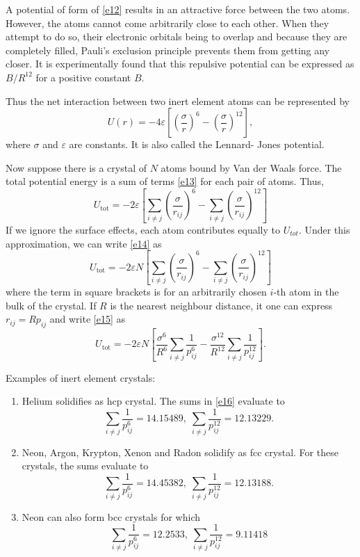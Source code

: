 \documentclass{article}
\begin{document}
A potential of form of \eqref{e12} results in an attractive force between the
two atoms. However, the atoms cannot come arbitrarily close to each other. When
they attempt to do so, their electronic orbitals being to overlap and because
they are completely filled, Pauli's exclusion principle prevents them from
getting any closer. It is experimentally found that this repulsive potential can
be expressed as $B/R^{12}$ for a positive constant $B$.

Thus the net interaction between two inert element atoms can be represented by
\begin{equation}\label{e13}
U(r) = -4\varepsilon\left[\left(\frac{\sigma}{r}\right)^6 - 
\left(\frac{\sigma}{r}\right)^{12}\right],
\end{equation}
where $\sigma$ and $\varepsilon$ are constants. It is also called the Lennard-
Jones potential.

Now suppose there is a crystal of $N$ atoms bound by Van der Waals force. The
total potential energy is a sum of terms \eqref{e13} for each pair of atoms.
Thus,
\begin{equation}\label{e14}
U_{\text{tot}} = -2\varepsilon\left[
\sum_{i \ne j}\left(\frac{\sigma}{r_{ij}}\right)^6 - 
\sum_{i \ne j}\left(\frac{\sigma}{r_{ij}}\right)^{12}\right]
\end{equation}
If we ignore the surface effects, each atom contributes equally to $U_{tot}$.
Under this approximation, we can write \eqref{e14} as
\begin{equation}\label{e15}
U_{\text{tot}} = -2\varepsilon N\left[
\sum_{i \ne j}\left(\frac{\sigma}{r_{ij}}\right)^6 - 
\sum_{i \ne j}\left(\frac{\sigma}{r_{ij}}\right)^{12}\right]
\end{equation}
where the term in square brackets is for an arbitrarily chosen $i$-th atom in
the bulk of the crystal. If $R$ is the nearest neighbour distance, it one can
express $r_{ij} = Rp_{ij}$ and write \eqref{e15} as
\begin{equation}\label{e16}
U_{\text{tot}} = -2\varepsilon N\left[
\frac{\sigma^6}{R^6}\sum_{i \ne j}\frac{1}{p_{ij}^6} - 
\frac{\sigma^{12}}{R^{12}}\sum_{i \ne j}\frac{1}{p_{ij}^{12}}\right].
\end{equation}

Examples of inert element crystals:
\begin{enumerate}
\item Helium solidifies as hcp crystal. The sums in \eqref{e16} evaluate to
\[
\sum_{i \ne j}\frac{1}{p_{ij}^6} = 14.15489, \;
\sum_{i \ne j}\frac{1}{p_{ij}^{12}} = 12.13229.
\]

\item Neon, Argon, Krypton, Xenon and Radon solidify as fcc crystal. For these
crystals, the sums evaluate to
\[
\sum_{i \ne j}\frac{1}{p_{ij}^6} = 14.45382, \;
\sum_{i \ne j}\frac{1}{p_{ij}^{12}} = 12.13188.
\]

\item Neon can also form bcc crystals for which
\[
\sum_{i \ne j}\frac{1}{p_{ij}^6} = 12.2533, \;
\sum_{i \ne j}\frac{1}{p_{ij}^{12}} = 9.11418
\]
\end{enumerate}
\end{document}
